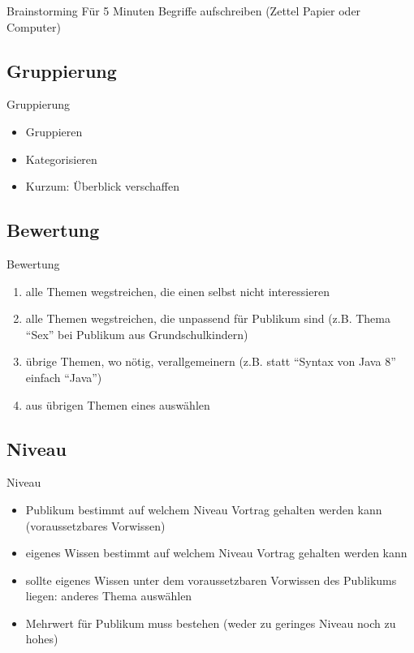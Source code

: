 \documentclass{beamer}
\begin{document}
    \begin{frame}{Brainstorming}
        \centering
        Für 5 Minuten Begriffe aufschreiben (Zettel Papier oder Computer)
    \end{frame}

    \subsection{Gruppierung}

    \begin{frame}{Gruppierung}
        \begin{itemize}
            \item Gruppieren
            \item Kategorisieren
            \item Kurzum: Überblick verschaffen
        \end{itemize}
    \end{frame}

    \subsection{Bewertung}

    \begin{frame}{Bewertung}
        \begin{enumerate}
            \item alle Themen wegstreichen, die einen selbst nicht interessieren
            \item alle Themen wegstreichen, die unpassend für Publikum sind (z.B. Thema "`Sex"' bei Publikum aus Grundschulkindern)
            \item übrige Themen, wo nötig, verallgemeinern (z.B. statt "`Syntax von Java 8"' einfach "`Java"')
            \item aus übrigen Themen eines auswählen
        \end{enumerate}
    \end{frame}

    \subsection{Niveau}

    \begin{frame}{Niveau}
        \begin{itemize}
            \item Publikum bestimmt auf welchem Niveau Vortrag gehalten werden kann (voraussetzbares Vorwissen)
            \item eigenes Wissen bestimmt auf welchem Niveau Vortrag gehalten werden kann
            \item sollte eigenes Wissen unter dem voraussetzbaren Vorwissen des Publikums liegen: anderes Thema auswählen
            \item Mehrwert für Publikum muss bestehen (weder zu geringes Niveau noch zu hohes)
        \end{itemize}
    \end{frame}
\end{document}
